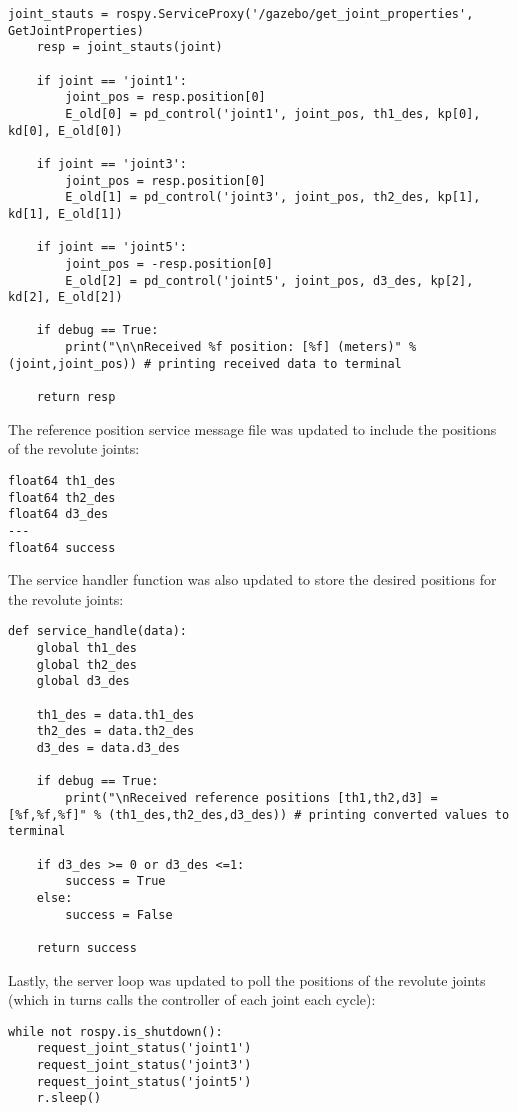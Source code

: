 \documentclass[10pt]{article}
\begin{document}
\begin{enumerate}
\begin{lstlisting}[style=Matlab-editor,basicstyle=\mlttfamily,escapechar=`]
	joint_stauts = rospy.ServiceProxy('/gazebo/get_joint_properties', GetJointProperties)
	resp = joint_stauts(joint)
	
	if joint == 'joint1':
		joint_pos = resp.position[0]
		E_old[0] = pd_control('joint1', joint_pos, th1_des, kp[0], kd[0], E_old[0])
	
	if joint == 'joint3':
		joint_pos = resp.position[0]
		E_old[1] = pd_control('joint3', joint_pos, th2_des, kp[1], kd[1], E_old[1])
	
	if joint == 'joint5':
		joint_pos = -resp.position[0]
		E_old[2] = pd_control('joint5', joint_pos, d3_des, kp[2], kd[2], E_old[2])
	
	if debug == True:
		print("\n\nReceived %f position: [%f] (meters)" % (joint,joint_pos)) # printing received data to terminal
	
	return resp
\end{lstlisting} 

	The reference position service message file was updated to include the positions of the revolute joints:
	
\begin{lstlisting}[style=Matlab-editor,basicstyle=\mlttfamily,escapechar=`]
float64 th1_des
float64 th2_des
float64 d3_des
---
float64 success
\end{lstlisting}

	The service handler function was also updated to store the desired positions for the revolute joints:
	
\begin{lstlisting}[style=Matlab-editor,basicstyle=\mlttfamily,escapechar=`]
	def service_handle(data):
	global th1_des
	global th2_des
	global d3_des
	
	th1_des = data.th1_des
	th2_des = data.th2_des
	d3_des = data.d3_des
	
	if debug == True:
		print("\nReceived reference positions [th1,th2,d3] = [%f,%f,%f]" % (th1_des,th2_des,d3_des)) # printing converted values to terminal
	
	if d3_des >= 0 or d3_des <=1:
		success = True
	else:
		success = False
	
	return success
\end{lstlisting}	

	Lastly, the server loop was updated to poll the positions of the revolute joints (which in turns calls the controller of each joint each cycle):
	
\begin{lstlisting}[style=Matlab-editor,basicstyle=\mlttfamily,escapechar=`]
while not rospy.is_shutdown():
	request_joint_status('joint1')
	request_joint_status('joint3')
	request_joint_status('joint5')
	r.sleep()
\end{lstlisting}	



\end{enumerate}
\end{document}
